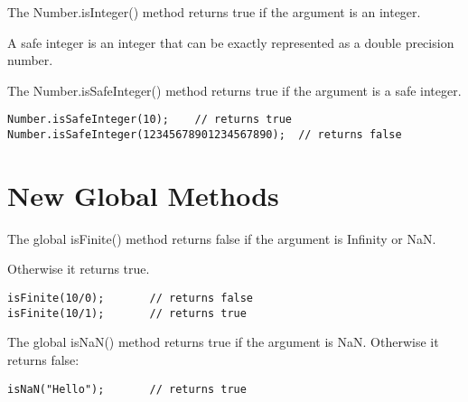 \documentclass[a4paper,12pt]{article}
\begin{document}
\begin{large}
The Number.isInteger() method returns true if the argument is an integer.

A safe integer is an integer that can be exactly represented as a double precision number.

The Number.isSafeInteger() method returns true if the argument is a safe integer.

\begin{lstlisting}
Number.isSafeInteger(10);    // returns true
Number.isSafeInteger(12345678901234567890);  // returns false
\end{lstlisting}


\section*{New Global Methods}

The global isFinite() method returns false if the argument is Infinity or NaN.

Otherwise it returns true.

\begin{lstlisting}
isFinite(10/0);       // returns false
isFinite(10/1);       // returns true
\end{lstlisting}

The global isNaN() method returns true if the argument is NaN. Otherwise it returns false:


\begin{lstlisting}
isNaN("Hello");       // returns true
\end{lstlisting}



\end{large}
\end{document}
